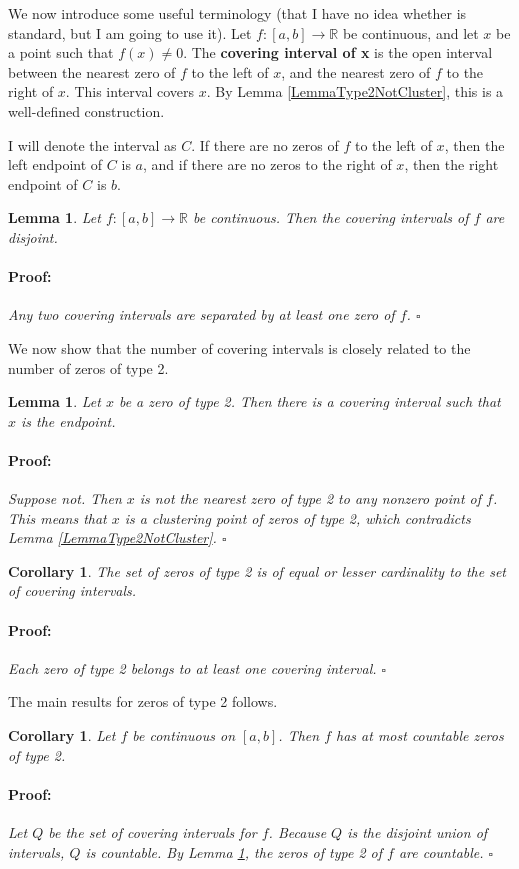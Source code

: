 \documentclass{article}
\newenvironment{proof}{\paragraph{Proof:}}{\hfill$\square$}
\newtheorem{lemma}[theorem]{Lemma}
\newtheorem{corollary}[theorem]{Corollary}
\newcommand{\R}{\mathbb{R}}
\begin{document}
We now introduce some useful terminology (that I have no idea whether is standard, but I am going to use it). Let $f: [a, b] \rightarrow \R$ be continuous, and let $x$ be a point such that $f(x) \neq 0$. The \textbf{covering interval of x} is the open interval between the nearest zero of $f$ to the left of $x$, and the nearest zero of $f$ to the right of $x$. This interval covers $x$. By Lemma \ref{LemmaType2NotCluster}, this is a well-defined construction.

I will denote the interval as $C$. If there are no zeros of $f$ to the left of $x$, then the left endpoint of $C$ is $a$, and if there are no zeros to the right of $x$, then the right endpoint of $C$ is $b$.

\begin{lemma}
Let $f: [a, b] \rightarrow \R$ be continuous. Then the covering intervals of $f$ are disjoint.
\begin{proof}
Any two covering intervals are separated by at least one zero of $f$.
\end{proof}
\end{lemma}

We now show that the number of covering intervals is closely related to the number of zeros of type 2.

\begin{lemma}
Let $x$ be a zero of type 2. Then there is a covering interval such that $x$ is the endpoint. 
\begin{proof}
Suppose not. Then $x$ is not the nearest zero of type 2 to any nonzero point of $f$. This means that $x$ is a clustering point of zeros of type 2, which contradicts Lemma \ref{LemmaType2NotCluster}.
\end{proof}
\end{lemma}

\begin{corollary}
\label{CorollaryZeroType2Cardinality}
The set of zeros of type 2 is of equal or lesser cardinality to the set of covering intervals.
\begin{proof}
Each zero of type 2 belongs to at least one covering interval.
\end{proof}
\end{corollary}

The main results for zeros of type 2 follows.

\begin{corollary}
Let $f$ be continuous on $[a, b]$. Then $f$ has at most countable zeros of type 2.
\begin{proof}
Let $Q$ be the set of covering intervals for $f$. Because $Q$ is the disjoint union of intervals, $Q$ is countable. By Lemma \ref{CorollaryZeroType2Cardinality}, the zeros of type 2 of $f$ are countable.
\end{proof}
\end{corollary}
\end{document}
